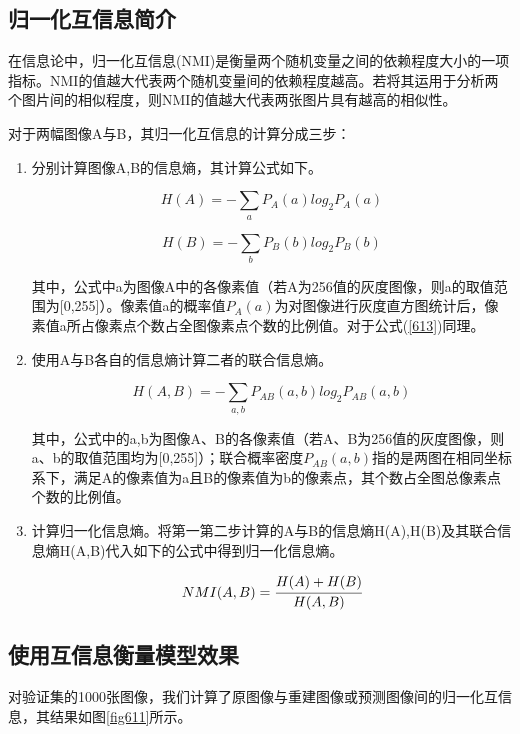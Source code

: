 \subsection{归一化互信息简介}
在信息论中，归一化互信息(NMI)是衡量两个随机变量之间的依赖程度大小的一项指标。NMI的值越大代表两个随机变量间的依赖程度越高。若将其运用于分析两个图片间的相似程度，则NMI的值越大代表两张图片具有越高的相似性。

对于两幅图像A与B，其归一化互信息的计算分成三步：

\begin{enumerate}
	\item 分别计算图像A,B的信息熵，其计算公式如下。
	
	\begin{equation}\label{612}
		H(A) = -\sum_aP_A(a)log_2P_A(a)
	\end{equation}

	\begin{equation}\label{613}
		H(B) = -\sum_bP_B(b)log_2P_B(b)
	\end{equation}

	其中，公式中a为图像A中的各像素值（若A为256值的灰度图像，则a的取值范围为[0,255]）。像素值a的概率值$P_A(a)$为对图像进行灰度直方图统计后，像素值a所占像素点个数占全图像素点个数的比例值。对于公式(\ref{613})同理。
	
	\item 使用A与B各自的信息熵计算二者的联合信息熵。
	
	\begin{equation}\label{614}
		H(A,B)=-\sum_{a,b}P_{AB}(a,b)log_2P_{AB}(a,b)
	\end{equation}
	
	其中，公式中的a,b为图像A、B的各像素值（若A、B为256值的灰度图像，则a、b的取值范围均为[0,255]）；联合概率密度$P_{AB}(a,b)$指的是两图在相同坐标系下，满足A的像素值为a且B的像素值为b的像素点，其个数占全图总像素点个数的比例值。
	
	\item 计算归一化信息熵。将第一第二步计算的A与B的信息熵H(A),H(B)及其联合信息熵H(A,B)代入如下的公式中得到归一化信息熵。
	
	\begin{equation}\label{615}
		NMI(A,B)=\cfrac{H(A)+H(B)}{H(A,B)}
	\end{equation}
\end{enumerate}

\subsection{使用互信息衡量模型效果}
对验证集的1000张图像，我们计算了原图像与重建图像或预测图像间的归一化互信息，其结果如图\ref{fig611}所示。

